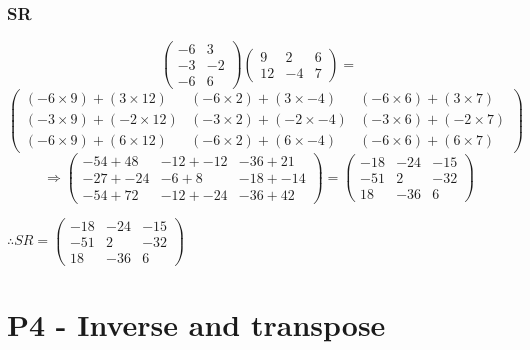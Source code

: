 \documentclass{article}
\begin{document}
\subsubsection{SR}
\[
	\begin{pmatrix}
		-6 & 3\\
		-3 & -2\\
		-6 & 6
	\end{pmatrix}
	\begin{pmatrix}
		9 & 2 & 6\\
		12 & -4 & 7
	\end{pmatrix}
	=
\]
\[
	\begin{pmatrix}
		(-6\times9)+(3\times12) & (-6\times2)+(3\times-4) & (-6\times6)+(3\times7)\\
		(-3\times9)+(-2\times12) & (-3\times2)+(-2\times-4) & (-3\times6)+(-2\times7)\\
		(-6\times9)+(6\times12) & (-6\times2)+(6\times-4) & (-6\times6)+(6\times7)
	\end{pmatrix}

\]
\[
	\Rightarrow
	\begin{pmatrix}
		-54+48 & -12+-12 & -36+21\\
		-27+-24 & -6+8 & -18+-14\\
		-54+72 & -12+-24 & -36+42
	\end{pmatrix}
	=
	\begin{pmatrix}
		-18 & -24 & -15\\
		-51 & 2 & -32\\
		18 & -36 & 6
	\end{pmatrix}
\]
\begin{center}\vspace{0.5cm}$\therefore
	SR=
	\begin{pmatrix}
		-18 & -24 & -15\\
		-51 & 2 & -32\\
		18 & -36 & 6
	\end{pmatrix}
$\end{center}

\section{P4 - Inverse and transpose}
\end{document}
